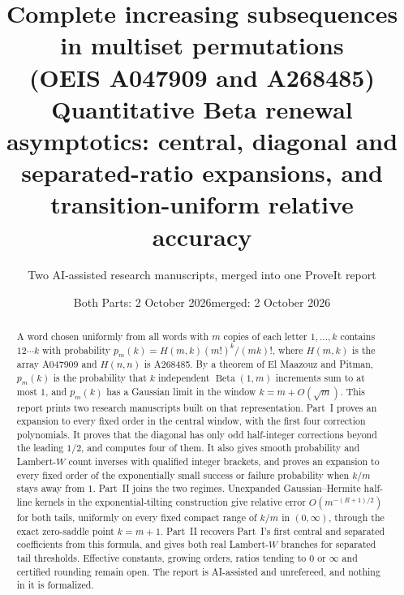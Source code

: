 \documentclass[11pt]{article}
\title{Complete increasing subsequences in multiset permutations\\(OEIS A047909 and A268485)\\[6pt]
\large Quantitative Beta renewal asymptotics: central, diagonal and\\separated-ratio expansions, and transition-uniform relative accuracy}
\author{Two AI-assisted research manuscripts, merged into one ProveIt report}
\date{Both Parts: 2 October 2026\quad merged: 2 October 2026}
\numberwithin{equation}{section}
\theoremstyle{remark}\newtheorem{remark}[theorem]{Remark}
\begin{document}
\maketitle
\begin{abstract}
A word chosen uniformly from all words with $m$ copies of each letter $1,\ldots,k$ contains $12\cdots k$ with probability $p_m(k)=H(m,k)(m!)^k/(mk)!$, where $H(m,k)$ is the array A047909 and $H(n,n)$ is A268485. By a theorem of El Maazouz and Pitman, $p_m(k)$ is the probability that $k$ independent $\operatorname{Beta}(1,m)$ increments sum to at most $1$, and $p_m(k)$ has a Gaussian limit in the window $k=m+O(\sqrt m)$. This report prints two research manuscripts built on that representation. Part~I proves an expansion to every fixed order in the central window, with the first four correction polynomials. It proves that the diagonal has only odd half-integer corrections beyond the leading $1/2$, and computes four of them. It also gives smooth probability and Lambert-$W$ count inverses with qualified integer brackets, and proves an expansion to every fixed order of the exponentially small success or failure probability when $k/m$ stays away from $1$. Part~II joins the two regimes. Unexpanded Gaussian--Hermite half-line kernels in the exponential-tilting construction give relative error $O(m^{-(R+1)/2})$ for both tails, uniformly on every fixed compact range of $k/m$ in $(0,\infty)$, through the exact zero-saddle point $k=m+1$. Part~II recovers Part~I's first central and separated coefficients from this formula, and gives both real Lambert-$W$ branches for separated tail thresholds. Effective constants, growing orders, ratios tending to $0$ or $\infty$ and certified rounding remain open. The report is AI-assisted and unrefereed, and nothing in it is formalized.
\end{abstract}
\setcounter{tocdepth}{1}
\tableofcontents
\newpage
\end{document}
